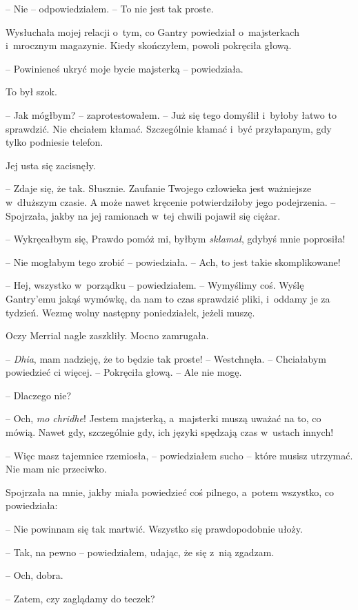 \documentclass[oneside,polish,11pt,sfheadings]{mwbk}
\begin{document}
-- Nie -- odpowiedziałem. -- To nie jest tak proste.

Wysłuchała mojej relacji o~tym, co Gantry powiedział o~majsterkach i~mrocznym magazynie. Kiedy skończyłem, powoli pokręciła głową.

-- Powinieneś ukryć moje bycie majsterką -- powiedziała.

To był szok. 

-- Jak mógłbym? -- zaprotestowałem. -- Już się tego domyślił i~byłoby łatwo to sprawdzić. Nie chciałem kłamać. Szczególnie kłamać i~być
przyłapanym, gdy tylko podniesie telefon.

Jej usta się zacisnęły. 

-- Zdaje się, że tak. Słusznie. Zaufanie Twojego
człowieka jest ważniejsze w~dłuższym czasie. A może nawet kręcenie
potwierdziłoby jego podejrzenia. -- Spojrzała, jakby na jej ramionach w~tej chwili pojawił się ciężar.

-- Wykręcałbym się, Prawdo pomóż mi, byłbym \textit{skłamał}, gdybyś mnie
poprosiła!

-- Nie mogłabym tego zrobić -- powiedziała. -- Ach, to jest takie
skomplikowane!

-- Hej, wszystko w~porządku -- powiedziałem. -- Wymyślimy coś. Wyślę
Gantry'emu jakąś wymówkę, da nam to czas sprawdzić pliki, i~oddamy je za
tydzień. Wezmę wolny następny poniedziałek, jeżeli muszę.

Oczy Merrial nagle zaszkliły. Mocno zamrugała.

-- \textit{Dhia}, mam nadzieję, że to będzie tak proste! -- Westchnęła. -- Chciałabym powiedzieć ci więcej. -- Pokręciła głową. -- Ale nie mogę.

-- Dlaczego nie?

-- Och, \textit{mo chridhe}! Jestem majsterką, a~majsterki muszą uważać na
to, co mówią. Nawet gdy, szczególnie gdy, ich języki spędzają czas w~ustach innych!

-- Więc masz tajemnice rzemiosła, -- powiedziałem sucho -- które musisz
utrzymać. Nie mam nic przeciwko.

Spojrzała na mnie, jakby miała powiedzieć coś pilnego, a~potem wszystko,
co powiedziała: 

-- Nie powinnam się tak martwić. Wszystko się
prawdopodobnie ułoży.

-- Tak, na pewno -- powiedziałem, udając, że się z~nią zgadzam. 

-- Och, dobra. 

-- Zatem, czy zaglądamy do teczek?
\end{document}

